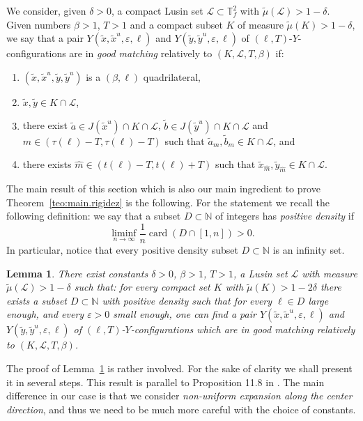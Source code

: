 \documentclass[a4paper,11pt,reqno]{amsart}
\newcommand{\N}{{\mathbb N}}
\newcommand{\TTf}{{\mathbb{T}_f^2}}
\newcommand{\cL}{{\mathcal L}}
\newcommand{\eps}{\varepsilon}
\newcommand{\card}{\operatorname{card}}
\newcommand{\tix}{\tilde{x}}
\newcommand{\tm}{\tilde{\mu}}
\newtheorem{lemma}[theorem]{Lemma}
\theoremstyle{definition}
\begin{document}
We consider, given $\delta>0$, a compact Lusin set $\cL\subset\TTf$ with $\tm(\cL)>1-\delta$. Given numbers $\beta>1$, $T>1$ and a compact subset $K$ of measure $\tm(K)>1-\delta$, we say that a pair $Y(\tix,\tix^u,\eps,\ell)$ and $Y(\tilde{y},\tilde{y}^u,\eps,\ell)$ of $(\ell,T)$-$Y$-configurations are in \emph{good matching} relatively to $(K,\cL,T,\beta)$ if:
\begin{enumerate}
    \item $(\tix,\tix^u,\tilde{y},\tilde{y}^u)$ is a $(\beta,\ell)$ quadrilateral,
    \item $\tix,\tilde{y}\in K\cap\cL$,
    \item there exist $\tilde{a}\in J(\tix^u)\cap K\cap\cL$, $\tilde{b}\in J(\tilde{y}^u)\cap K\cap\cL$ and $m\in(\tau(\ell)-T,\tau(\ell)-T)$ such that $\tilde{a}_m,\tilde{b}_m\in K\cap\cL$, and
    \item there exists $\widehat{m}\in(t(\ell)-T,t(\ell)+T)$ such that $\tix_{\widehat{m}},\tilde{y}_{\widehat{m}}\in K\cap\cL$. 
\end{enumerate}

The main result of this section which is also our main ingredient to prove Theorem~\ref{teo:main.rigidez} is the following. For the statement we recall the following definition: we say that a subset $D\subset\N$ of integers has \emph{positive density} if 
\[
\liminf_{n\to\infty}\frac{1}{n}\card(D\cap[1,n])>0.
\]
In particular, notice that every positive density subset $D\subset\N$ is an infinity set.
\begin{lemma}
    \label{lem:matching}
    There exist constants $\delta>0$, $\beta>1$, $T>1$, a Lusin set $\cL$ with measure $\tm(\cL)>1-\delta$ such that: for every compact set $K$ with $\tm(K)>1-2\delta$ there exists a subset $D\subset\N$ with positive density such that  for every $\ell\in D$ large enough, and every $\eps>0$ small enough, one can find a pair $Y(\tix,\tix^u,\eps,\ell)$ and $Y(\tilde{y},\tilde{y}^u,\eps,\ell)$ of $(\ell,T)$-$Y$-configurations which are in good matching relatively to $(K,\cL,T,\beta)$. 
\end{lemma}

The proof of Lemma~\ref{lem:matching} is rather involved. For the sake of clarity we shall present it in several steps. This result is parallel to Proposition 11.8 in \cite{ALOS}. The main difference in our case is that we consider \emph{non-uniform expansion along the center direction}, and thus we need to be much more careful with the choice of constants.
\end{document}
